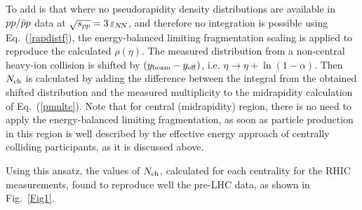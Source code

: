 \documentclass[twocolumn,showpacs,preprintnumbers,prd,superscriptaddress,nofootinbib]{revtex4}
\begin{document}
 To add is that where no  pseudorapidity density distributions are 
available in $pp/{\bar p}p$ data
 at
$\sqrt{s_{pp}}= 3\, \varepsilon_{N\!N}$, and therefore no integration is possible using 
Eq.~(\ref{rapdistf}), the energy-balanced limiting fragmentation scaling 
is
 applied to reproduce the calculated $\rho(\eta)$.
 The measured
distribution from  a
non-central
heavy-ion collision
is shifted by $(y_{\rm beam}-y_{\rm eff})$,
 i.e. 
 $\eta\to
 \eta+\ln(1-\alpha)$.
 Then
 $N_{\rm ch}$ is calculated by adding
 the difference between the integral from
the obtained shifted
 distribution and the measured multiplicity to the midrapidity calculation 
of
  Eq.~(\ref{pmultc}).
 Note that for central (midrapidity) region, there is no need to apply 
the energy-balanced limiting fragmentation, as soon as particle production 
in this region is well described by the effective energy approach of 
centrally colliding participants, as it is discussed above.  

 Using
 this
 ansatz,
 the values of $N_{\rm ch}$, calculated for
 each
 centrality for the RHIC measurements,
 found to
reproduce well the pre-LHC data, 
 as 
    shown 
 in Fig.~\ref{Fig1}. 
\end{document}
